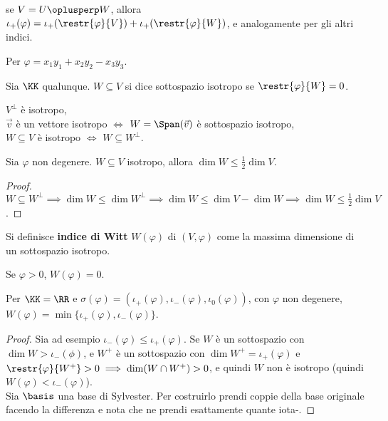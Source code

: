 \documentclass[11pt]{article}
\begin{document}
	\begin{remark}\nl
		\li se $V = U \oplusperp W$, allora $\iota_+(\varphi) = \iota_+(\restr{\varphi}{V}) + \iota_+(\restr{\varphi}{W})$, e
		analogamente per gli altri indici.
	\end{remark}

	\begin{example}
		Per $\varphi = x_1 y_1 + x_2 y_2 - x_3 y_3$. %
	\end{example}

	\begin{definition}
		Sia $\KK$ qualunque. $W \subseteq V$ si dice sottospazio isotropo
		se $\restr{\varphi}{W} = 0$.
	\end{definition}

	\begin{remark}\nl
		\li $V^\perp$ è isotropo, \\
		\li $\vec{v}$ è un vettore isotropo $\iff$ $W = \Span(\vec v)$ è sottospazio isotropo, \\
		\li $W \subseteq V$ è isotropo $\iff$ $W \subseteq W^\perp$.
	\end{remark}

	\begin{proposition}
		Sia $\varphi$ non degenere. $W \subseteq V$ isotropo, allora
		$\dim W \leq \frac{1}{2} \dim V$.
	\end{proposition}

	\begin{proof}
		$W \subseteq W^\perp \implies \dim W \leq \dim W^\perp \implies
		\dim W \leq \dim V - \dim W \implies \dim W \leq \frac{1}{2} \dim V$.
	\end{proof}

	\begin{definition}
		Si definisce \textbf{indice di Witt} $W(\varphi)$ di $(V, \varphi)$
		come la massima dimensione di un sottospazio isotropo. 
	\end{definition}

	\begin{remark}\nl
		\li Se $\varphi > 0$, $W(\varphi) = 0$.
	\end{remark}

	\begin{proposition}
		Per $\KK = \RR$ e $\sigma(\varphi) = (\iota_+(\varphi), \iota_-(\varphi), \iota_0(\varphi))$, con $\varphi$ non degenere,
		$W(\varphi) = \min\{\iota_+(\varphi), \iota_-(\varphi)\}$.
	\end{proposition}

	\begin{proof}
		Sia ad esempio $\iota_-(\varphi) \leq \iota_+(\varphi)$. Se $W$
		è un sottospazio con $\dim W > \iota_-(\phi)$, e $W^+$ è
		un sottospazio con $\dim W^+ = \iota_+(\varphi)$ e $\restr{\varphi}{W^+} > 0 \implies \dim (W \cap W^+) > 0$,
		e quindi $W$ non è isotropo (quindi $W(\varphi) < \iota_-(\varphi)$). \\
		
		Sia $\basis$ una base di Sylvester. Per costruirlo prendi
		coppie della base originale facendo la differenza e nota
		che ne prendi esattamente quante iota-.
	\end{proof}
\end{document}
